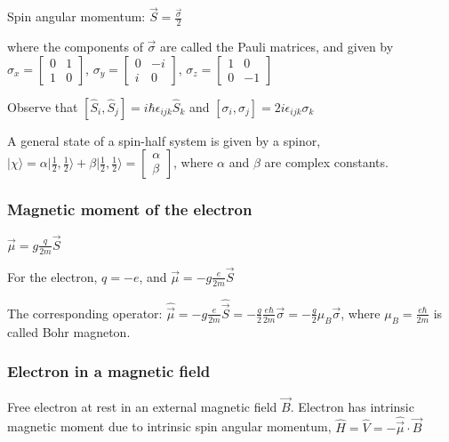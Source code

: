 Spin angular momentum: $\vec{S} = \frac{\vec{\sigma}}{2}$

where the components of $\vec{\sigma}$ are called the Pauli matrices, and given by $\sigma_x = \begin{bmatrix} 0 & 1 \\ 1 & 0 \end{bmatrix}$, $\sigma_y = \begin{bmatrix} 0 & -i \\ i & 0 \end{bmatrix}$, $\sigma_z = \begin{bmatrix} 1 & 0 \\ 0 & -1 \end{bmatrix}$

Observe that $[\widehat{S}_i, \widehat{S}_j] = i \hbar \epsilon_{ijk} \widehat{S}_k$ and $[\sigma_i, \sigma_j] = 2 i \epsilon_{ijk} \sigma_k$

A general state of a spin-half system is given by a spinor, $|\chi \rangle = \alpha | \frac{1}{2}, \frac{1}{2} \rangle + \beta | \frac{1}{2}, \frac{1}{2} \rangle = \begin{bmatrix} \alpha \\ \beta \end{bmatrix}$, where $\alpha$ and $\beta$ are complex constants.


\subsubsection{Magnetic moment of the electron}
$\vec{\mu} = g \frac{q}{2m} \vec{S}$

For the electron, $q=-e$, and $\vec{\mu} = -g \frac{e}{2m} \vec{S}$

The corresponding operator: $\widehat{\vec{\mu}} = -g \frac{e}{2m} \widehat{\vec{S}} = -\frac{g}{2} \frac{e \hbar}{2m} \vec{\sigma} = - \frac{g}{2} \mu_B \vec{\sigma}$, where $\mu_B = \frac{e \hbar}{2m}$ is called Bohr magneton.

\subsubsection{Electron in a magnetic field}

Free electron at rest in an external magnetic field $\vec{B}$. Electron has intrinsic magnetic moment due to intrinsic spin angular momentum, $\widehat{H} = \widehat{V} = -\widehat{\vec{\mu}} \cdot \vec{B}$

